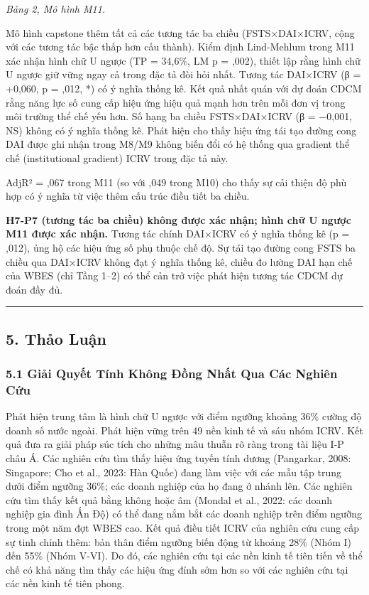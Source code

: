 \documentclass[12pt,a4paper]{article}
\begin{document}
\emph{Bảng 2, Mô hình M11.}

Mô hình capstone thêm tất cả các tương tác ba chiều (FSTS×DAI×ICRV, cộng
với các tương tác bậc thấp hơn cấu thành). Kiểm định Lind-Mehlum trong
M11 xác nhận hình chữ U ngược (TP = 34,6\%, LM p = ,002), thiết lập rằng
hình chữ U ngược giữ vững ngay cả trong đặc tả đòi hỏi nhất. Tương tác
DAI×ICRV (β = +0,060, p = ,012, *) có ý nghĩa thống kê. Kết quả nhất
quán với dự đoán CDCM rằng năng lực số cung cấp hiệu ứng hiệu quả mạnh
hơn trên mỗi đơn vị trong môi trường thể chế yếu hơn. Số hạng ba chiều
FSTS×DAI×ICRV (β = −0,001, NS) không có ý nghĩa thống kê. Phát hiện cho
thấy hiệu ứng tái tạo đường cong DAI được ghi nhận trong M8/M9 không
biến đổi có hệ thống qua gradient thể chế (institutional gradient) ICRV
trong đặc tả này.

AdjR² = ,067 trong M11 (so với ,049 trong M10) cho thấy sự cải thiện độ
phù hợp có ý nghĩa từ việc thêm cấu trúc điều tiết ba chiều.

\textbf{H7-P7 (tương tác ba chiều) không được xác nhận; hình chữ U ngược
M11 được xác nhận.} Tương tác chính DAI×ICRV có ý nghĩa thống kê (p =
,012), ủng hộ các hiệu ứng số phụ thuộc chế độ. Sự tái tạo đường cong
FSTS ba chiều qua DAI×ICRV không đạt ý nghĩa thống kê, chiều đo lường
DAI hạn chế của WBES (chỉ Tầng 1--2) có thể cản trở việc phát hiện tương
tác CDCM dự đoán đầy đủ.

\begin{center}\rule{0.5\linewidth}{0.5pt}\end{center}

\hypertarget{5-thux1ea3o-luux1eadn}{%
\subsection{5. Thảo Luận}\label{5-thux1ea3o-luux1eadn}}

\hypertarget{51-giux1ea3i-quyux1ebft-tuxednh-khuxf4ng-ux111ux1ed3ng-nhux1ea5t-qua-cuxe1c-nghiuxean-cux1ee9u}{%
\subsubsection{5.1 Giải Quyết Tính Không Đồng Nhất Qua Các Nghiên
Cứu}\label{51-giux1ea3i-quyux1ebft-tuxednh-khuxf4ng-ux111ux1ed3ng-nhux1ea5t-qua-cuxe1c-nghiuxean-cux1ee9u}}

Phát hiện trung tâm là hình chữ U ngược với điểm ngưỡng khoảng 36\%
cường độ doanh số nước ngoài. Phát hiện vững trên 49 nền kinh tế và sáu
nhóm ICRV. Kết quả đưa ra giải pháp súc tích cho những mâu thuẫn rõ ràng
trong tài liệu I-P châu Á. Các nghiên cứu tìm thấy hiệu ứng tuyến tính
dương (Pangarkar, 2008: Singapore; Cho et al., 2023: Hàn Quốc) đang làm
việc với các mẫu tập trung dưới điểm ngưỡng 36\%; các doanh nghiệp của
họ đang ở nhánh lên. Các nghiên cứu tìm thấy kết quả bằng không hoặc âm
(Mondal et al., 2022: các doanh nghiệp gia đình Ấn Độ) có thể đang nắm
bắt các doanh nghiệp trên điểm ngưỡng trong một năm đợt WBES cao. Kết
quả điều tiết ICRV của nghiên cứu cung cấp sự tinh chỉnh thêm: bản thân
điểm ngưỡng biến động từ khoảng 28\% (Nhóm I) đến 55\% (Nhóm V-VI). Do
đó, các nghiên cứu tại các nền kinh tế tiên tiến về thể chế có khả năng
tìm thấy các hiệu ứng đỉnh sớm hơn so với các nghiên cứu tại các nền
kinh tế tiên phong.
\end{document}
